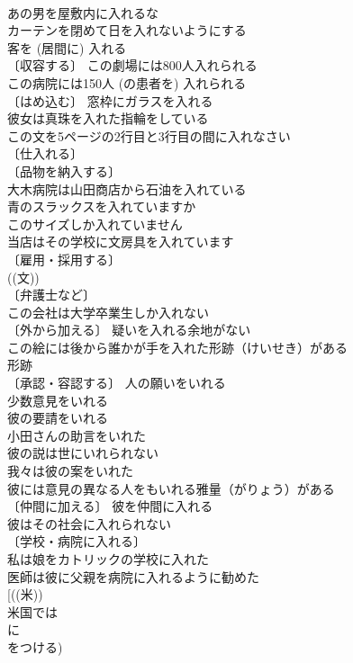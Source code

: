 \documentclass[8pt]{extreport}
\begin{document}
\begin{CJK}{UTF8}{min}
\\	あの男を屋敷内に入れるな 
\\	カーテンを閉めて日を入れないようにする 
\\	客を (居間に) 入れる 
\\	〔収容する〕 この劇場には800人入れられる 
\\	この病院には150人 (の患者を) 入れられる 
\\	〔はめ込む〕 窓枠にガラスを入れる 
\\	彼女は真珠を入れた指輪をしている 
\\	この文を5ページの2行目と3行目の間に入れなさい 
\\	〔仕入れる〕
\\	〔品物を納入する〕
\\	大木病院は山田商店から石油を入れている 
\\	青のスラックスを入れていますか 
\\	このサイズしか入れていません 
\\	当店はその学校に文房具を入れています 
\\	〔雇用・採用する〕
\\	((文)) 
\\	〔弁護士など〕
\\	この会社は大学卒業生しか入れない 
\\	〔外から加える〕 疑いを入れる余地がない 
\\	この絵には後から誰かが手を入れた形跡（けいせき）がある 
\\	形跡　
\\	〔承認・容認する〕 人の願いをいれる 
\\	少数意見をいれる 
\\	彼の要請をいれる 
\\	小田さんの助言をいれた 
\\	彼の説は世にいれられない 
\\	我々は彼の案をいれた 
\\	彼には意見の異なる人をもいれる雅量（がりょう）がある 
\\	〔仲間に加える〕 彼を仲間に入れる 
\\	彼はその社会に入れられない 
\\	〔学校・病院に入れる〕
\\	私は娘をカトリックの学校に入れた 
\\	医師は彼に父親を病院に入れるように勧めた 
\\	[((米)) 
\\	米国では
\\	に
\\	をつける) 

\end{CJK}
\end{document}
